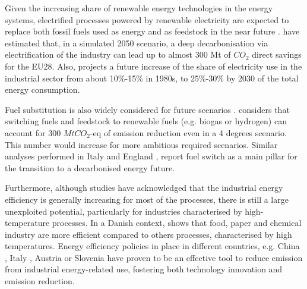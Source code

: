 \documentclass[review]{elsarticle}
\begin{document}
Given the increasing share of renewable energy technologies in the energy systems, electrified processes powered by renewable electricity are expected to replace both fossil fuels used as energy and as feedstock in the near future \cite{Lechtenbohmer2015, EnergyCommission2017, Energikommissionen2017, Lin2017}. \cite{Lechtenbohmer2016} have estimated that, in a simulated 2050 scenario, a deep decarbonisation via electrification of the industry can lead up to almost 300 Mt of $CO_2$ direct savings for the EU28. Also, \cite{IRENA2014} projects a future increase of the share of electricity use in the industrial sector from about 10\%-15\% in 1980s, to 25\%-30\% by 2030 of the total energy consumption.

Fuel substitution is also widely considered for future scenarios \cite{Lin2016,Rehfeldt2016}. \cite{Iea2012} considers that switching fuels and feedstock to renewable fuels (e.g. biogas or hydrogen) can account for 300 $MtCO_2$-eq of emission reduction even in a 4 degrees scenario. This number would increase for more ambitious required scenarios. Similar analyses performed in Italy \cite{Enea2016} and England \cite{Pye2015}, report fuel switch as a main pillar for the transition to a decarbonised energy future.

Furthermore, although studies have acknowledged that the industrial energy efficiency is generally increasing for most of the processes, there is still a large unexploited potential, particularly for industries characterised by high-temperature processes. In a Danish context, \cite{Buhler2016} shows that food, paper and chemical industry are more efficient compared to others processes, characterised by high temperatures. Energy efficiency policies in place in different countries, e.g. China \cite{Li2017,Zheng2017,Lin2017a,Miao2018,Guo2017}, Italy \cite{MazziottiGomezdeTeran2017}, Austria \cite{Karner2015} or Slovenia \cite{Pusnik2017} have proven to be an effective tool to reduce emission from industrial energy-related use, fostering both technology innovation and emission reduction.
\end{document}
